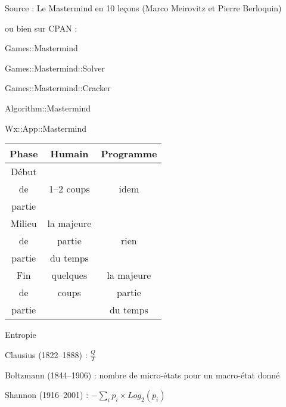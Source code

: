 \documentclass{slides}
\begin{document}
\begin{slide}

Source : Le Mastermind en 10 leçons
(Marco Meirovitz et Pierre Berloquin)

ou bien sur CPAN :

Games::Mastermind

Games::Mastermind::Solver

Games::Mastermind::Cracker

Algorithm::Mastermind

Wx::App::Mastermind

\end{slide}
\begin{slide}

\begin{tabular}{|c|c|c|}
\hline
Phase  & Humain & Programme \\
\hline
Début  &        & \\
  de   & 1--2 coups  & idem \\
partie &        & \\
\hline
Milieu & la majeure & \\
  de   & partie     & rien \\
partie & du temps   & \\
\hline
 Fin   & quelques   & la majeure \\
  de   & coups      & partie     \\
partie &            & du temps   \\
\hline
\end{tabular}

\end{slide}
\begin{slide}

\begin{center}
Entropie
\end{center}

Clausius (1822--1888) : $ \frac{Q}{T} $

Boltzmann (1844--1906) : nombre de micro-états pour un macro-état donné

Shannon (1916--2001) : $- \sum_i p_i \times Log_2(p_i)$

\end{slide}
\end{document}
